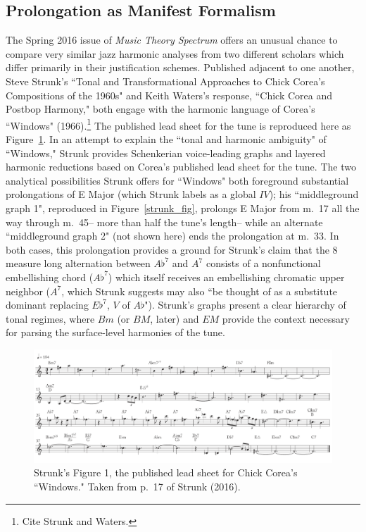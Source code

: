 \subsection{Prolongation as Manifest Formalism}

The Spring 2016 issue of \emph{Music Theory Spectrum} offers an unusual chance to compare very similar jazz harmonic analyses from two different scholars which differ primarily in their justification schemes.  Published adjacent to one another, Steve Strunk's ``Tonal and Transformational Approaches to Chick Corea's Compositions of the 1960s" and Keith Waters's response, ``Chick Corea and Postbop Harmony," both engage with the harmonic language of Corea's ``Windows" (1966).\footnote{Cite Strunk and Waters.}  The published lead sheet for the tune is reproduced here as Figure~\ref{windows}.  In an attempt to explain the ``tonal and harmonic ambiguity" of ``Windows," Strunk provides Schenkerian voice-leading graphs and layered harmonic reductions based on Corea's published lead sheet for the tune.  The two analytical possibilities Strunk offers for ``Windows" both foreground substantial prolongations of E Major (which Strunk labels as a global $IV$); his ``middleground graph 1", reproduced in Figure~\ref{strunk_fig}, prolongs E Major from m.\ 17 all the way through m.\ 45-- more than half the tune's length-- while an alternate ``middleground graph 2" (not shown here) ends the prolongation at m.\ 33.  In both cases, this prolongation provides a ground for Strunk's claim that the 8 measure long alternation between $A\flat^7$ and $A^7$ consists of a nonfunctional embellishing chord ($A\flat^7$) which itself receives an embellishing chromatic upper neighbor ($A^7$, which Strunk suggests may also ``be thought of as a substitute dominant replacing $E\flat^7$, $V$ of $A\flat$").  Strunk's graphs present a clear hierarchy of tonal regimes, where $Bm$ (or $BM$, later) and $EM$ provide the context necessary for parsing the surface-level harmonies of the tune.

\begin{figure}
	\centering
	\caption{Strunk's Figure 1, the published lead sheet for Chick Corea's ``Windows."  Taken from p.\ 17 of Strunk (2016).}\label{windows}
	\includegraphics[width=6.4in]{strunk_windows.png}	
\end{figure}

